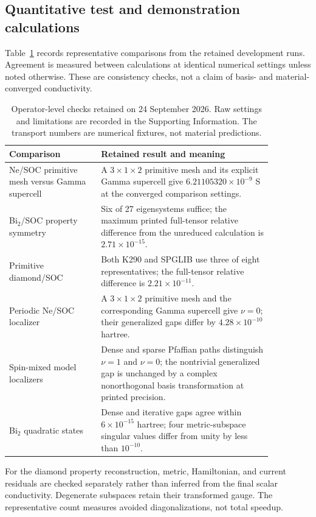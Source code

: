\subsection{Quantitative test and demonstration calculations}
Table~\ref{tab:operator-validation} records representative comparisons
from the retained development runs. Agreement is measured between
calculations at identical numerical settings unless noted otherwise.
These are consistency checks, not a claim of basis- and
material-converged conductivity.
\begin{table}[htbp]
\centering\small
\begin{tabular}{p{0.30\linewidth}p{0.56\linewidth}}
\toprule
Comparison & Retained result and meaning\\
\midrule
Ne/SOC primitive mesh versus Gamma supercell &
A $3\times1\times2$ primitive mesh and its explicit Gamma supercell
give $6.21105320\times10^{-9}$ S at the converged comparison settings.\\
Bi$_2$/SOC property symmetry &
Six of 27 eigensystems suffice; the maximum printed full-tensor
relative difference from the unreduced calculation is
$2.71\times10^{-15}$.\\
Primitive diamond/SOC &
Both K290 and SPGLIB use three of eight representatives; the
full-tensor relative difference is $2.21\times10^{-11}$.\\
Periodic Ne/SOC localizer &
A $3\times1\times2$ primitive mesh and the corresponding Gamma
supercell give $\nu=0$; their generalized gaps differ by
$4.28\times10^{-10}$ hartree.\\
Spin-mixed model localizers &
Dense and sparse Pfaffian paths distinguish $\nu=1$ and $\nu=0$;
the nontrivial generalized gap is unchanged by a complex
nonorthogonal basis transformation at printed precision.\\
Bi$_2$ quadratic states &
Dense and iterative gaps agree within $6\times10^{-15}$ hartree;
four metric-subspace singular values differ from unity by less
than $10^{-10}$.\\
\bottomrule
\end{tabular}
\caption{Operator-level checks retained on 24 September 2026.
Raw settings and limitations are recorded in the Supporting Information.
The transport numbers are numerical fixtures, not material predictions.}
\label{tab:operator-validation}
\end{table}

For the diamond property reconstruction, metric, Hamiltonian, and
current residuals are checked separately rather than inferred from
the final scalar conductivity. Degenerate subspaces retain their
transformed gauge. The representative count measures avoided
diagonalizations, not total speedup.

